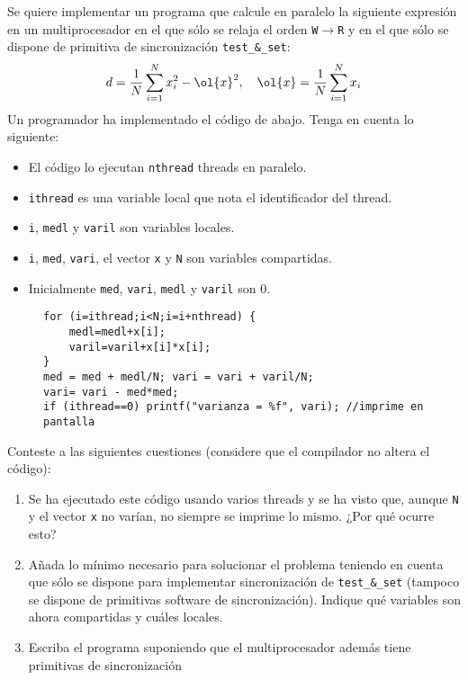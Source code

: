 \begin{ejercicio}
    Se quiere implementar un programa que calcule en paralelo la siguiente expresión en un
    multiprocesador en el que sólo se relaja el orden \verb|W|$\to$\verb|R| y en el que sólo se dispone de primitiva de
    sincronización \verb|test_&_set|:
    \[
        d = \frac{1}{N} \sum_{i=1}^{N} x_i^2 - \ol{x}^2, \quad \ol{x} = \frac{1}{N} \sum_{i=1}^{N} x_i
    \]
    Un programador ha implementado el código de abajo. Tenga en cuenta lo siguiente:
    \begin{itemize}
        \item El código lo ejecutan \verb|nthread| threads en paralelo.
        \item \verb|ithread| es una variable local que nota el identificador del thread.
        \item \verb|i|, \verb|medl| y \verb|varil| son variables locales.
        \item \verb|i|, \verb|med|, \verb|vari|, el vector \verb|x| y \verb|N| son variables compartidas.
        \item Inicialmente \verb|med|, \verb|vari|, \verb|medl| y \verb|varil| son 0.
    \end{itemize}
    \begin{figure}[H]
        \centering
        \begin{verbatim}
for (i=ithread;i<N;i=i+nthread) {
    medl=medl+x[i];
    varil=varil+x[i]*x[i];
}
med = med + medl/N; vari = vari + varil/N;
vari= vari - med*med;
if (ithread==0) printf("varianza = %f", vari); //imprime en pantalla
        \end{verbatim}
    \end{figure}
    Conteste a las siguientes cuestiones (considere que el compilador no altera el código):
    \begin{enumerate}
        \item Se ha ejecutado este código usando varios threads y se ha visto que, aunque \verb|N| y el vector \verb|x| no
        varían, no siempre se imprime lo mismo. ¿Por qué ocurre esto?
        \item Añada lo mínimo necesario para solucionar el problema teniendo en cuenta que sólo se dispone
        para implementar sincronización de \verb|test_&_set| (tampoco se dispone de primitivas software de
        sincronización). Indique qué variables son ahora compartidas y cuáles locales.
        \item Escriba el programa suponiendo que el multiprocesador además tiene primitivas de sincronización

\end{enumerate}
\end{ejercicio}
